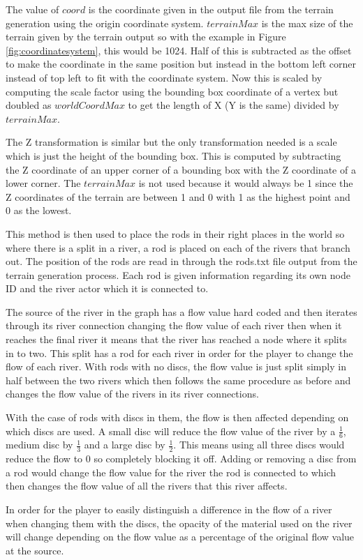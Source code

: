 The value of \(coord\) is the coordinate given in the output file from the terrain generation using the origin coordinate system. \(terrainMax\) is the max size of the terrain given by the terrain output so with the example in Figure \ref{fig:coordinatesystem}, this would be 1024. Half of this is subtracted as the offset to make the coordinate in the same position but instead in the bottom left corner instead of top left to fit with the coordinate system. Now this is scaled by computing the scale factor using the bounding box coordinate of a vertex but doubled as \(worldCoordMax\) to get the length of X (Y is the same) divided by \(terrainMax\).
\newline
\par
The Z transformation is similar but the only transformation needed is a scale which is just the height of the bounding box. This is computed by subtracting the Z coordinate of an upper corner of a bounding box with the Z coordinate of a lower corner. The \(terrainMax\) is not used because it would always be 1 since the Z coordinates of the terrain are between 1 and 0 with 1 as the highest point and 0 as the lowest.
\newline
\par
This method is then used to place the rods in their right places in the world so where there is a split in a river, a rod is placed on each of the rivers that branch out. The position of the rods are read in through the rods.txt file output from the terrain generation process. Each rod is given information regarding its own node ID and the river actor which it is connected to.
\newline
\par
The source of the river in the graph has a flow value hard coded and then iterates through its river connection changing the flow value of each river then when it reaches the final river it means that the river has reached a node where it splits in to two. This split has a rod for each river in order for the player to change the flow of each river. With rods with no discs, the flow value is just split simply in half between the two rivers which then follows the same procedure as before and changes the flow value of the rivers in its river connections.
\newline
\par
With the case of rods with discs in them, the flow is then affected depending on which discs are used. A small disc will reduce the flow value of the river by a \(\frac{1}{6}\), medium disc by \(\frac{1}{3}\) and a large disc by \(\frac{1}{2}\). This means using all three discs would reduce the flow to 0 so completely blocking it off. Adding or removing a disc from a rod would change the flow value for the river the rod is connected to which then changes the flow value of all the rivers that this river affects.
\newline
\par
In order for the player to easily distinguish a difference in the flow of a river when changing them with the discs, the opacity of the material used on the river will change depending on the flow value as a percentage of the original flow value at the source.


